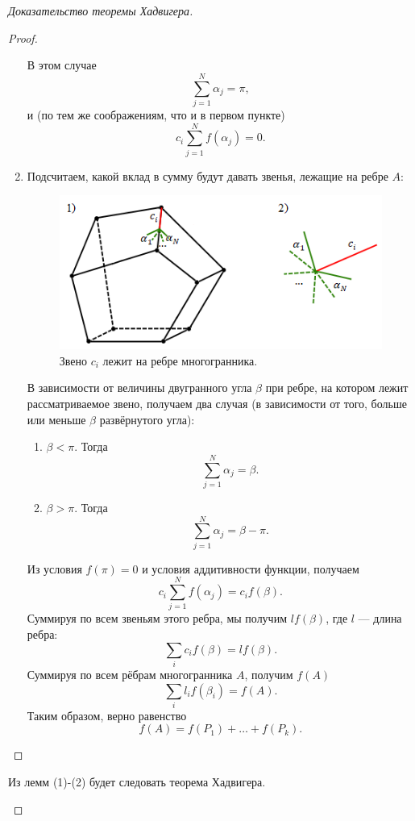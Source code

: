 \begin{proof}[Доказательство теоремы Хадвигера]
\begin{proof}
\begin{enumerate}
\begin{figure}[htbp]
            \label{fig:c8.7}
        \end{figure}
        В этом случае \[\sum_{j = 1}^{N} \alpha_j = \pi,\]
        и (по тем же соображениям, что и в первом пункте)
        \[c_i \sum_{j = 1}^{N} f(\alpha_j) = 0.\]
        \item Подсчитаем, какой вклад в сумму будут давать звенья, лежащие на ребре $A$:
        \begin{figure}[htbp]
            \centering
            \includegraphics[scale=0.7]{images/c8.8.png}
            \caption{Звено $c_i$ лежит на ребре многогранника.}
            \label{fig:c8.8}
        \end{figure}
        В зависимости от величины двугранного угла $\beta$ при ребре, на котором лежит рассматриваемое звено, получаем два случая (в зависимости от того, больше или меньше $\beta$ развёрнутого угла):
        \begin{enumerate}
            \item $\beta < \pi$. Тогда \[\sum_{j = 1}^{N} \alpha_j = \beta.\]
            \item $\beta > \pi$. Тогда \[\sum_{j = 1}^{N} \alpha_j = \beta - \pi.\]
        \end{enumerate}
        Из условия $f(\pi) = 0$ и условия аддитивности функции, получаем
        \[c_i \sum_{j = 1}^{N} f(\alpha_j) = c_i f(\beta).\]
        Суммируя по всем звеньям этого ребра, мы получим $lf(\beta)$, где $l$ — длина ребра:
        \[\sum_i c_i f(\beta) = l f(\beta).\]
        Суммируя по всем рёбрам многогранника $A$, получим $f(A)$
        \[\sum_i l_i f(\beta_i) = f(A).\]
        Таким образом, верно равенство 
        \[f(A) = f(P_1) + \dots + f(P_k).\]
    \end{enumerate}
    
\end{proof}

\begin{remark}
    Из лемм (1)-(2) будет следовать теорема Хадвигера.
\end{remark}
\end{proof}
